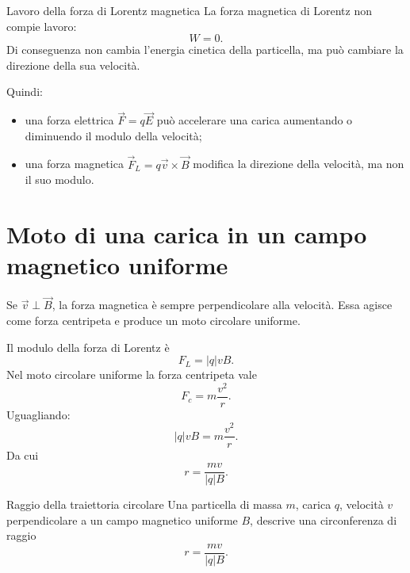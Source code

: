 \documentclass[a4paper]{article}
\begin{document}
\begin{snippetproposition}{Lavoro della forza di Lorentz magnetica}
    La forza magnetica di Lorentz non compie lavoro:
    \[
        W=0.
    \]
    Di conseguenza non cambia l'energia cinetica della particella, ma può cambiare la direzione della sua velocità.
\end{snippetproposition}

Quindi:
\begin{itemize}
    \item una forza elettrica \(\vec{F}=q\vec{E}\) può accelerare una carica aumentando o diminuendo il modulo della velocità;
    \item una forza magnetica \(\vec{F}_L=q\vec{v}\times\vec{B}\) modifica la direzione della velocità, ma non il suo modulo.
\end{itemize}

\section{Moto di una carica in un campo magnetico uniforme}

Se \(\vec{v}\perp\vec{B}\), la forza magnetica è sempre perpendicolare alla velocità. Essa agisce come forza centripeta e produce un moto circolare uniforme.

\begin{center}
\end{center}

Il modulo della forza di Lorentz è
\[
    F_L=|q|vB.
\]
Nel moto circolare uniforme la forza centripeta vale
\[
    F_c=m\frac{v^2}{r}.
\]
Uguagliando:
\[
    |q|vB=m\frac{v^2}{r}.
\]
Da cui
\[
    r=\frac{mv}{|q|B}.
\]

\begin{snippettheorem}{Raggio della traiettoria circolare}
    Una particella di massa \(m\), carica \(q\), velocità \(v\) perpendicolare a un campo magnetico uniforme \(B\), descrive una circonferenza di raggio
    \[
        r=\frac{mv}{|q|B}.
    \]
\end{snippettheorem}
\end{document}

